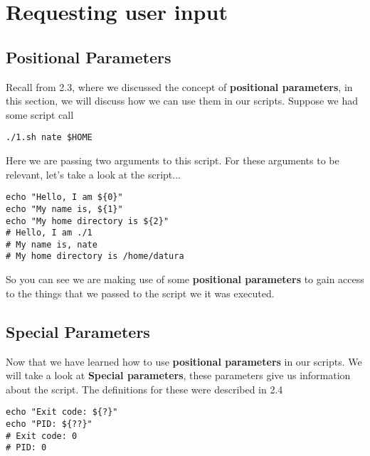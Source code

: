 \documentclass{report}
\begin{document}
  \pagebreak \bigbreak \noindent 
  \section{\LARGE Requesting user input}
  \bigbreak \noindent 
  \subsection{Positional Parameters}
  \bigbreak \noindent 
  Recall from 2.3, where we discussed the concept of \textbf{positional parameters}, in this section, we will discuss how we can use them in our scripts.
  \bigbreak \noindent 
  Suppose we had some script call
  
  \begin{verbatim}
./1.sh nate $HOME
  \end{verbatim}
  \bigbreak \noindent
  
  \bigbreak \noindent 
  Here we are passing two arguments to this script. For these arguments to be relevant, let's take a look at the script...
  
  \begin{verbatim}
echo "Hello, I am ${0}"
echo "My name is, ${1}"
echo "My home directory is ${2}"
# Hello, I am ./1
# My name is, nate
# My home directory is /home/datura
  \end{verbatim}
  \bigbreak \noindent
  
  \bigbreak \noindent 
  So you can see we are making use of some \textbf{positional parameters} to gain access to the things that we passed to the script we it was executed.
  \bigbreak \noindent 

  \bigbreak \noindent 
  \subsection{Special Parameters}
  \bigbreak \noindent 
  Now that we have learned how to use \textbf{positional parameters} in our scripts. We will take a look at \textbf{Special parameters}, these parameters give us information about the script. The definitions for these were described in 2.4
  \bigbreak \noindent 
  
  \begin{verbatim}
echo "Exit code: ${?}"
echo "PID: ${??}"
# Exit code: 0 
# PID: 0
  \end{verbatim}
  \bigbreak \noindent
  
\end{document}
